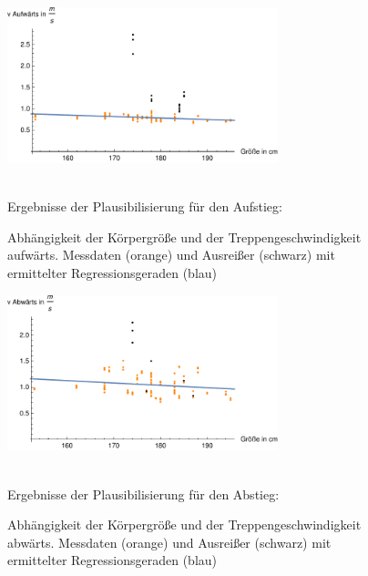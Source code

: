 \begin{figure}[htpb]
\centering
\includegraphics[width=0.7\textwidth]{abbildungen/regression/2012_2017_verbund/ohneausreisser/auf-groesse.pdf}
\caption{Abhängigkeit der Körpergröße und der Treppengeschwindigkeit aufwärts. Messdaten (orange) und Ausreißer (schwarz) mit ermittelter Regressionsgeraden (blau)}
\label{fig:2012_und_2017_MA_auf_groesse}
\justify \ \\
Ergebnisse der Plausibilisierung für den Aufstieg:

\end{figure}
\begin{figure}[htpb]
\centering
\includegraphics[width=0.7\textwidth]{abbildungen/regression/2012_2017_verbund/ohneausreisser/ab-groesse.pdf}
\caption{Abhängigkeit der Körpergröße und der Treppengeschwindigkeit abwärts. Messdaten (orange) und Ausreißer (schwarz) mit ermittelter Regressionsgeraden (blau)}
\label{fig:2012_und_2017_MA_ab_groesse}
\justify \ \\
Ergebnisse der Plausibilisierung für den Abstieg:

\end{figure}




















